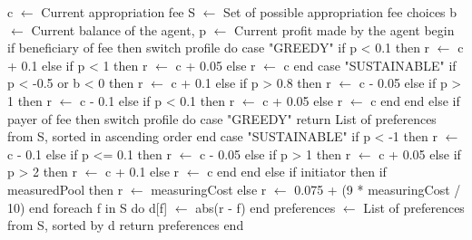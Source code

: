 
\begin{pseudocode}[label=alg:appfeevote,caption={Appropriation fee voting algorithm.}]
c $\leftarrow$ Current appropriation fee
S $\leftarrow$ Set of possible appropriation fee choices
b $\leftarrow$ Current balance of the agent,
p $\leftarrow$ Current profit made by the agent
begin
	if beneficiary of fee then
		switch profile do
			case "GREEDY"
				if p < 0.1 then r $\leftarrow$ c + 0.1
				else if p < 1 then r $\leftarrow$ c + 0.05
				else r $\leftarrow$ c
			end
			case "SUSTAINABLE"
				if p < -0.5 or b < 0 then r $\leftarrow$ c + 0.1
				else if p > 0.8 then r $\leftarrow$ c - 0.05
				else if p > 1 then r $\leftarrow$ c - 0.1
				else if p < 0.1 then r $\leftarrow$ c + 0.05
				else r $\leftarrow$ c
			end
		end
	else if payer of fee then
		switch profile do
			case "GREEDY"
				return List of preferences from S, sorted in ascending order
			end
			case "SUSTAINABLE"
				if p < -1 then r $\leftarrow$ c - 0.1
				else if p <= 0.1 then r $\leftarrow$ c - 0.05
				else if p > 1 then r $\leftarrow$ c + 0.05
				else if p > 2 then r $\leftarrow$ c + 0.1
				else r $\leftarrow$ c
			end
		end
	else if initiator then
		if measuredPool then r $\leftarrow$ measuringCost
		else r $\leftarrow$ 0.075 + (9 * measuringCost / 10)
	end
	foreach f in S do
		d[f] $\leftarrow$ abs(r - f)
	end
	preferences $\leftarrow$ List of preferences from S, sorted by d
	return preferences
end
\end{pseudocode}

